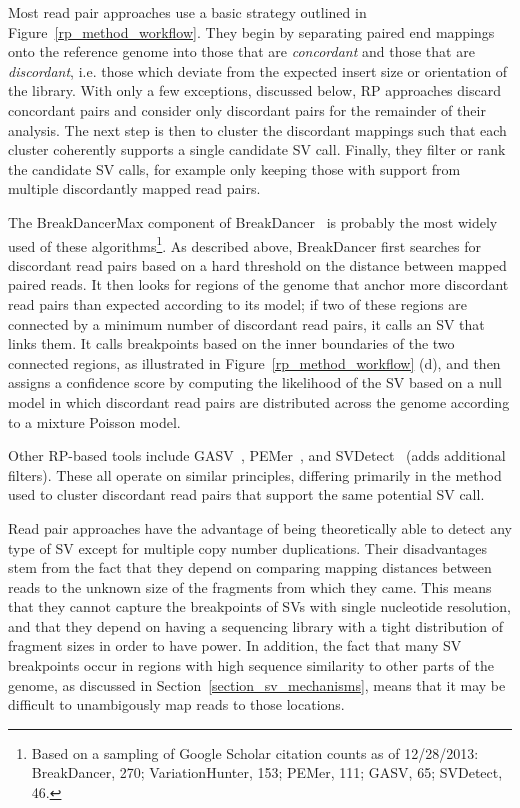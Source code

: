 Most read pair approaches use a basic strategy outlined in Figure~\ref{rp_method_workflow}. They begin by separating paired end mappings onto the reference genome into those that are \emph{concordant} and those that are \emph{discordant}, i.e. those which deviate from the expected insert size or orientation of the library. With only a few exceptions, discussed below, RP approaches discard concordant pairs and consider only discordant pairs for the remainder of their analysis. The next step is then to cluster the discordant mappings such that each cluster coherently supports a single candidate SV call. Finally, they filter or rank the candidate SV calls, for example only keeping those with support from multiple discordantly mapped read pairs. 

The BreakDancerMax component of BreakDancer~\cite{Chen:2009p3} is probably the most widely used of these algorithms\footnote{Based on a sampling of Google Scholar citation counts as of 12/28/2013: BreakDancer, 270; VariationHunter, 153; PEMer, 111; GASV, 65; SVDetect, 46.}. As described above, BreakDancer first searches for discordant read pairs based on a hard threshold on the distance between mapped paired reads. It then looks for regions of the genome that anchor more discordant read pairs than expected according to its model; if two of these regions are connected by a minimum number of discordant read pairs, it calls an SV that links them. It calls breakpoints based on the inner boundaries of the two connected regions, as illustrated in Figure~\ref{rp_method_workflow} (d), and then assigns a confidence score by computing the likelihood of the SV based on a null model in which discordant read pairs are distributed across the genome according to a mixture Poisson model.

Other RP-based tools include GASV~\cite{Sindi:2009gu}, PEMer~\cite{Korbel:2009dy}, and SVDetect~\cite{Zeitouni:2010p8} (adds additional filters). These all operate on similar principles, differing primarily in the method used to cluster discordant read pairs that support the same potential SV call. 

Read pair approaches have the advantage of being theoretically able to detect any type of SV except for multiple copy number duplications. Their disadvantages stem from the fact that they depend on comparing mapping distances between reads to the unknown size of the fragments from which they came. This means that they cannot capture the breakpoints of SVs with single nucleotide resolution, and that they depend on having a sequencing library with a tight distribution of fragment sizes in order to have power. In addition, the fact that many SV breakpoints occur in regions with high sequence similarity to other parts of the genome, as discussed in Section~\ref{section_sv_mechanisms}, means that it may be difficult to unambigously map reads to those locations.

